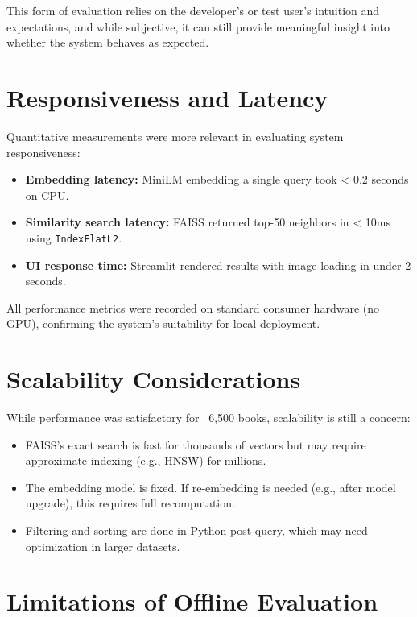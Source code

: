 This form of evaluation relies on the developer's or test user's intuition and expectations, and while subjective, it can still provide meaningful insight into whether the system behaves as expected.

\section{Responsiveness and Latency}
\label{sec:latency}

Quantitative measurements were more relevant in evaluating system responsiveness:

\begin{itemize}
    \item \textbf{Embedding latency:} MiniLM embedding a single query took < 0.2 seconds on CPU.
    \item \textbf{Similarity search latency:} FAISS returned top-50 neighbors in < 10ms using \texttt{IndexFlatL2}.
    \item \textbf{UI response time:} Streamlit rendered results with image loading in under 2 seconds.
\end{itemize}

All performance metrics were recorded on standard consumer hardware (no GPU), confirming the system's suitability for local deployment.

\section{Scalability Considerations}
\label{sec:scaling}

While performance was satisfactory for ~6,500 books, scalability is still a concern:

\begin{itemize}
    \item FAISS's exact search is fast for thousands of vectors but may require approximate indexing (e.g., HNSW) for millions.
    \item The embedding model is fixed. If re-embedding is needed (e.g., after model upgrade), this requires full recomputation.
    \item Filtering and sorting are done in Python post-query, which may need optimization in larger datasets.
\end{itemize}

\section{Limitations of Offline Evaluation}
\label{sec:limitations}

